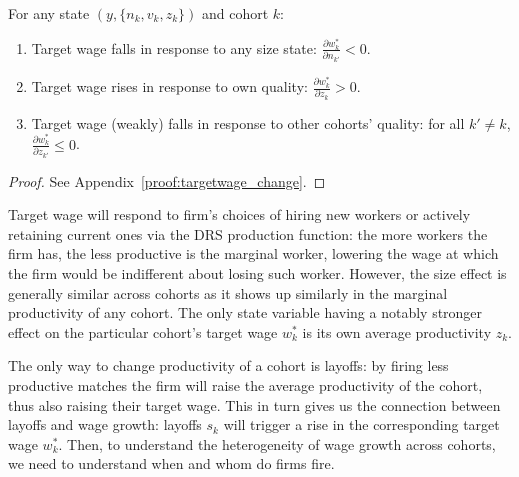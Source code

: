 \begin{proposition}\label{prop:targetwage_change}

For any state $(y,\{n_k,v_k,z_k\})$ and cohort $k$:

\begin{enumerate}
\item Target wage falls in response to any size state: $\displaystyle \frac{\partial w_k^*}{\partial n_{k'}}<0$.
\item Target wage rises in response to own quality: %
$\displaystyle \frac{\partial w_k^*}{\partial z_k}>0$.
\item Target wage (weakly) falls in response to other cohorts' quality: %
for all $k'\neq k$,
$\displaystyle \frac{\partial w_k^*}{\partial z_{k'}}\le 0$.
\end{enumerate}
\end{proposition}

\begin{proof}
See Appendix~\ref{proof:targetwage_change}.
\end{proof}



Target wage will respond to firm's choices of hiring new workers or actively retaining current ones via the DRS production function: the more workers the firm has, the less productive is the marginal worker, lowering the wage at which the firm would be indifferent about losing such worker. However, the size effect is generally similar across cohorts as it shows up similarly in the marginal productivity of any cohort. The only state variable having a notably stronger effect on the particular cohort's target wage $w^*_k$ is its own average productivity $z_k$. 

The only way to change productivity of a cohort is layoffs: by firing less productive matches the firm will raise the average productivity of the cohort, thus also raising their target wage. This in turn gives us the connection between layoffs and wage growth: layoffs $s_k$ will trigger a rise in the corresponding target wage $w^*_k$.
Then, to understand the heterogeneity of wage growth across cohorts, we need to understand when and whom do firms fire.

